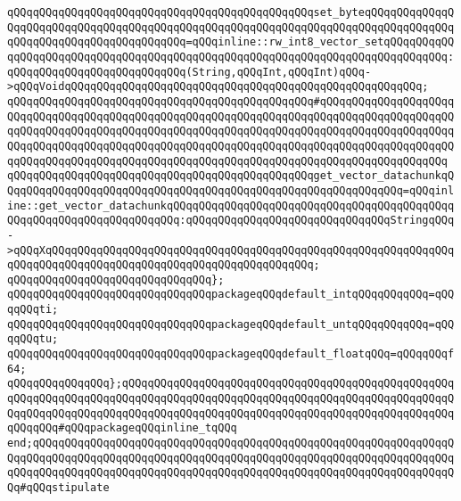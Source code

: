 \verb|qQQqqQQqqQQqqQQqqQQqqQQqqQQqqQQqqQQqqQQqqQQqqQQqset_byteqQQqqQQqqQQqqQQqqQQqqQQqqQQqqQQqqQQqqQQqqQQqqQQqqQQqqQQqqQQqqQQqqQQqqQQqqQQqqQQqqQQqqQQqqQQqqQQqqQQqqQQqqQQqqQQq=qQQqinline::rw_int8_vector_setqQQqqQQqqQQqqQQqqQQqqQQqqQQqqQQqqQQqqQQqqQQqqQQqqQQqqQQqqQQqqQQqqQQqqQQqqQQqqQQq:qQQqqQQqqQQqqQQqqQQqqQQqqQQq(String,qQQqInt,qQQqInt)qQQq->qQQqVoidqQQqqQQqqQQqqQQqqQQqqQQqqQQqqQQqqQQqqQQqqQQqqQQqqQQqqQQq;|\newline
\verb|qQQqqQQqqQQqqQQqqQQqqQQqqQQqqQQqqQQqqQQqqQQqqQQq#qQQqqQQqqQQqqQQqqQQqqQQqqQQqqQQqqQQqqQQqqQQqqQQqqQQqqQQqqQQqqQQqqQQqqQQqqQQqqQQqqQQqqQQqqQQqqQQqqQQqqQQqqQQqqQQqqQQqqQQqqQQqqQQqqQQqqQQqqQQqqQQqqQQqqQQqqQQqqQQqqQQqqQQqqQQqqQQqqQQqqQQqqQQqqQQqqQQqqQQqqQQqqQQqqQQqqQQqqQQqqQQqqQQqqQQqqQQqqQQqqQQqqQQqqQQqqQQqqQQqqQQqqQQqqQQqqQQqqQQqqQQqqQQqqQQqqQQqqQQq|\newline
\verb|qQQqqQQqqQQqqQQqqQQqqQQqqQQqqQQqqQQqqQQqqQQqqQQqget_vector_datachunkqQQqqQQqqQQqqQQqqQQqqQQqqQQqqQQqqQQqqQQqqQQqqQQqqQQqqQQqqQQqqQQq=qQQqinline::get_vector_datachunkqQQqqQQqqQQqqQQqqQQqqQQqqQQqqQQqqQQqqQQqqQQqqQQqqQQqqQQqqQQqqQQqqQQqqQQq:qQQqqQQqqQQqqQQqqQQqqQQqqQQqqQQqStringqQQq->qQQqXqQQqqQQqqQQqqQQqqQQqqQQqqQQqqQQqqQQqqQQqqQQqqQQqqQQqqQQqqQQqqQQqqQQqqQQqqQQqqQQqqQQqqQQqqQQqqQQqqQQqqQQqqQQqqQQq;|\newline
\verb|qQQqqQQqqQQqqQQqqQQqqQQqqQQqqQQq};|\newline
\newline
\verb|qQQqqQQqqQQqqQQqqQQqqQQqqQQqqQQqpackageqQQqdefault_intqQQqqQQqqQQq=qQQqqQQqti;|\newline
\verb|qQQqqQQqqQQqqQQqqQQqqQQqqQQqqQQqpackageqQQqdefault_untqQQqqQQqqQQq=qQQqqQQqtu;|\newline
\verb|qQQqqQQqqQQqqQQqqQQqqQQqqQQqqQQqpackageqQQqdefault_floatqQQq=qQQqqQQqf64;|\newline
\verb|qQQqqQQqqQQqqQQq};qQQqqQQqqQQqqQQqqQQqqQQqqQQqqQQqqQQqqQQqqQQqqQQqqQQqqQQqqQQqqQQqqQQqqQQqqQQqqQQqqQQqqQQqqQQqqQQqqQQqqQQqqQQqqQQqqQQqqQQqqQQqqQQqqQQqqQQqqQQqqQQqqQQqqQQqqQQqqQQqqQQqqQQqqQQqqQQqqQQqqQQqqQQqqQQqqQQqqQQq#qQQqpackageqQQqinline_tqQQq|\newline
\verb|end;qQQqqQQqqQQqqQQqqQQqqQQqqQQqqQQqqQQqqQQqqQQqqQQqqQQqqQQqqQQqqQQqqQQqqQQqqQQqqQQqqQQqqQQqqQQqqQQqqQQqqQQqqQQqqQQqqQQqqQQqqQQqqQQqqQQqqQQqqQQqqQQqqQQqqQQqqQQqqQQqqQQqqQQqqQQqqQQqqQQqqQQqqQQqqQQqqQQqqQQqqQQqqQQq#qQQqstipulate|\newline
\newline

